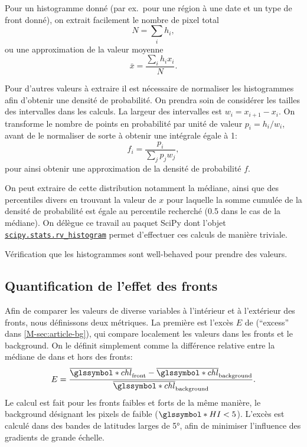 \documentclass[index]{subfiles}
\begin{document}
Pour un histogramme donné (par ex.\ pour une région à une date et un type de front donné), on extrait facilement le nombre de pixel total
\begin{equation}
  N = \sum_i h_i,
\end{equation}
ou une approximation de la valeur moyenne
\begin{equation}
  \bar{x} = \frac{\sum_i h_i x_i} {N}.
\end{equation}

Pour d'autres valeurs à extraire il est nécessaire de normaliser les histogrammes afin d'obtenir une densité de probabilité. On prendra soin de considérer les tailles des intervalles dans les calculs.
La largeur des intervalles est \(w_i = x_{i+1}-x_i\). On transforme le nombre de points en probabilité par unité de valeur \(p_i = h_i / w_i \), avant de le normaliser de sorte à obtenir une intégrale égale à 1:
\begin{equation}
  f_i = \frac{p_i} {\sum_j p_j w_j},
\end{equation}
pour ainsi obtenir une approximation de la densité de probabilité \(f\).

On peut extraire de cette distribution notamment la médiane, ainsi que des percentiles divers en trouvant la valeur de \(x\) pour laquelle la somme cumulée de la densité de probabilité est égale au percentile recherché (0.5 dans le cas de la médiane).
On délègue ce travail au paquet SciPy dont l'objet \href{%
  https://docs.scipy.org/%
  doc/scipy/reference/generated/%
  scipy.stats.rv_histogram.html%
}{\texttt{scipy.stats.rv\_histogram}}
permet d'effectuer ces calculs de manière triviale.

Vérification que les histogrammes sont well-behaved pour prendre des valeurs.

\subsection{Quantification de l'effet des fronts}
\label{sec:extraction-surplus}

Afin de comparer les valeurs de diverse variables à l'intérieur et à l'extérieur des fronts, nous définissons deux métriques.
La première est l'excès \(E\) de  (\enquote{excess} dans \cref{M-sec:article-bg}), qui compare localement les valeurs dans les fronts et le background. On le définit simplement comme la différence relative entre la médiane de  dans et hors des fronts:
\begin{equation}
  E = \frac{\med{\am{chl}}_\frt - \med{\am{chl}}_\bkg}
  {\med{\am{chl}}_\bkg} .
\end{equation}
Le calcul est fait pour les fronts faibles et forts de la même manière, le background désignant les pixels de  faible (\(\am{HI} < 5\)).
L'excès est calculé dans des bandes de latitudes larges de \ang{5}, afin de minimiser l'influence des gradients de grande échelle.
\end{document}
